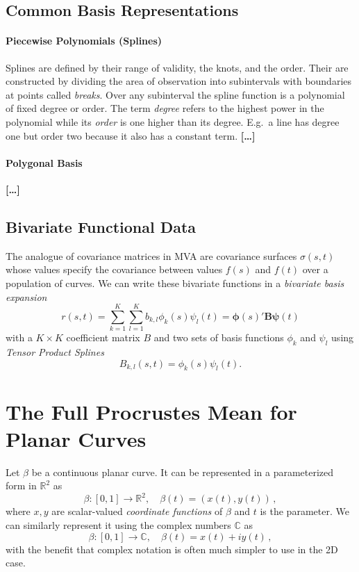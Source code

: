 \subsection{Common Basis Representations}
\paragraph{Piecewise Polynomials (Splines)}
Splines are defined by their range of validity, the knots, and the order.
Their are constructed by dividing the area of observation into subintervals with boundaries at points called \textit{breaks}.
Over any subinterval the spline function is a polynomial of fixed degree or order.
The term \textit{degree} refers to the highest power in the polynomial while its \textit{order} is one higher than its degree.
E.g.\ a line has degree one but order two because it also has a constant term. 
\textbf{[\dots]}


\paragraph{Polygonal Basis}
\textbf{[\dots]}


\subsection{Bivariate Functional Data}
The analogue of covariance matrices in MVA are covariance surfaces $\sigma(s,t)$ whose values specify the covariance between values $f(s)$ and $f(t)$ over a population of curves.
We can write these bivariate functions in a \textit{bivariate basis expansion} $$ r(s,t) = \sum_{k=1}^K \sum_{l=1}^K b_{k,l} \phi_k(s) \psi_l(t) 
  = \bm{\phi}(s)' \bm{B} \bm{\psi}(t) $$
with a $K \times K$ coefficient matrix $B$ and two sets of basis functions $\phi_k$ and $\psi_l$ using \textit{Tensor Product Splines}
$$ B_{k,l}(s,t) = \phi_k(s) \psi_l(t).$$



\newpage
\section{The Full Procrustes Mean for Planar Curves}
Let $\beta$ be a continuous planar curve. It can be represented in a parameterized form in $\mathbb{R}^2$ as
$$ \beta : [0,1] \rightarrow \mathbb{R}^2,\quad \beta(t) = ( x(t), y(t)) \,, $$
where $x, y$ are scalar-valued \textit{coordinate functions} of $\beta$ and $t$ is the parameter.
We can similarly represent it using the complex numbers $\mathbb{C}$ as
$$ \beta : [0,1] \rightarrow \mathbb{C},\quad \beta(t) = x(t) + iy(t) \,, $$
with the benefit that complex notation is often much simpler to use in the 2D case.

